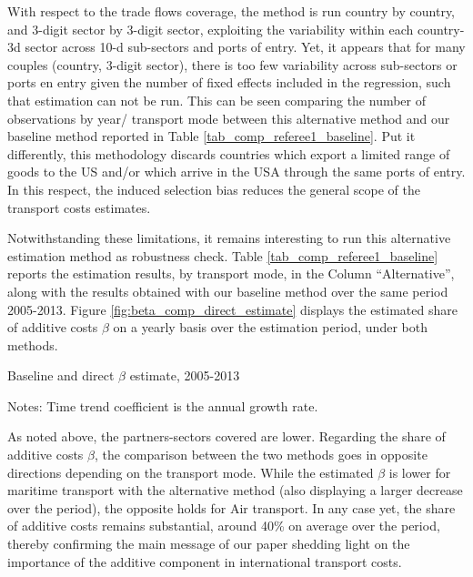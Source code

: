 \documentclass[11pt,twoside, authoryear]{elsarticle}
\begin{document}
With respect to the trade flows coverage, the method is run country by country, and 3-digit sector by 3-digit sector, exploiting the variability within each country-3d sector across 10-d sub-sectors and ports of entry. Yet, it appears that for many couples (country, 3-digit sector), there is too few variability across sub-sectors or ports en entry given the number of fixed effects included in the regression, such that estimation can not be run. This can be seen comparing the number of observations by year/ transport mode between this alternative method and our baseline method reported in Table \ref{tab_comp_referee1_baseline}. Put it differently, this methodology discards countries which export a limited range of goods to the US and/or which arrive in the USA through the same ports of entry. In this respect, the induced selection bias reduces the general scope of the transport costs estimates.

Notwithstanding these limitations, it remains interesting to run this alternative estimation method as robustness check. Table \ref{tab_comp_referee1_baseline} reports the estimation results, by transport mode, in the Column ``Alternative'', along with the results obtained with our baseline method over the same period 2005-2013. Figure \ref{fig:beta_comp_direct_estimate} displays the estimated share of additive costs $\beta$ on a yearly basis over the estimation period, under both methods.



\begin{table}[htbp]
	\caption{Baseline and direct $\beta$ estimate, 2005-2013}
	\begin{center}		
		
	
{\parbox[l]{12cm}{ \vspace{4pt}\footnotesize{Notes: Time trend coefficient is the annual growth rate.}}}
\end{center}
	\label{tab_comp_referee1_baseline}%
\end{table}%


As noted above, the partners-sectors covered are lower. Regarding the share of additive costs $\beta$, the comparison between the two methods goes in opposite directions depending on the transport mode. While the estimated $\beta$ is lower for maritime transport with the alternative method (also displaying a larger decrease over the period), the opposite holds for Air transport. In any case yet, the share of additive costs remains substantial, around 40\% on average over the period, thereby confirming the main message of our paper shedding light on the importance of the additive component in international transport costs.
\end{document}
